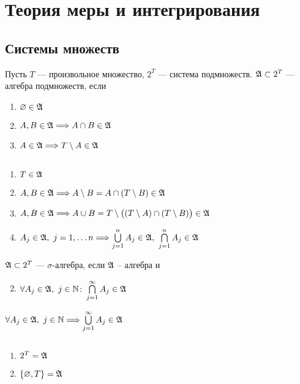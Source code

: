 \chapter{Теория меры и интегрирования}
\section{Системы множеств}

\begin{defn}
    Пусть $ T$ --- произвольное множество, $ 2^{T}$ --- система подмножеств. $ \mathfrak{A} \subset 2^{T}$ --- {\sf алгебра подмножеств}, если 
\begin{enumerate}[label=(\roman*),noitemsep]
    \item  $ \varnothing \in \mathfrak{A}$
	\item $ A, B \in \mathfrak{A} \Longrightarrow  A \cap B \in \mathfrak{A}$

	\item $ A \in \mathfrak{A} \Longrightarrow T \setminus A \in \mathfrak{A} $
\end{enumerate} 
\end{defn}
\begin{prop}
	$ $
	\begin{enumerate}[noitemsep]
        \item $ T \in \mathfrak{A}$
		\item $ A, B \in \mathfrak{A} \Longrightarrow A \setminus B  = A \cap (T \setminus B) \in \mathfrak{A}$
		\item $ A, B \in \mathfrak{A} \Longrightarrow A \cup B = T \setminus \bigl( (T\setminus A) \cap (T \setminus B) \bigr) \in \mathfrak{A}$
		\item $ A_j \in \mathfrak{A}, ~ j = 1,\ldots n \Longrightarrow \bigcup\limits_{j=1}^{n} A_j \in \mathfrak{A}, ~ \bigcap\limits_{j=1}^{n}A_j \in \mathfrak{A}$
    \end{enumerate} 
\end{prop}
\begin{defn}
	$ \mathfrak{A} \subset 2^{T}$ --- $ \sigma $-алгебра, если $ \mathfrak{A}$ -- алгебра и 
	\begin{enumerate}[label=(\roman* $\sigma$),noitemsep]
		\setcounter{enumi}{1}
	    \item $ \forall A_j \in \mathfrak{A},~ j \in \mathbb{N}\colon \bigcap\limits_{j=1}^{\infty} A_j \in \mathfrak{A}$
	\end{enumerate} 
	\begin{note}
	    $ \forall A_j \in \mathfrak{A}, ~ j \in \mathbb{N} \Longrightarrow \bigcup\limits_{j=1}^{\infty} A_j \in \mathfrak{A}$
	\end{note}
\end{defn}
\begin{ex}
	$ $
	\begin{enumerate}[noitemsep]
	    \item $ 2^{T} = \mathfrak{A}$ 
		\item $ \{\varnothing, T\} = \mathfrak{A}$
	\end{enumerate} 
\end{ex}

